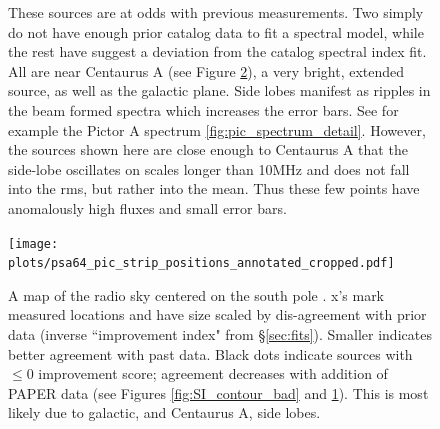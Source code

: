\documentclass[preprint]{aastex}
\begin{document}
\begin{figure}[htbp]
\begin{center}
\end{center}
\caption{
These sources are at odds with previous measurements.
Two simply do not have enough
prior catalog data to fit a spectral model, while the rest have
suggest a deviation from the catalog spectral index fit.
All are near Centaurus A (see Figure
\ref{fig:error_map}), a very bright, extended source, as well as the galactic plane.
Side lobes manifest as
ripples in the beam formed spectra which increases the error bars. See for example the 
Pictor A spectrum \ref{fig:pic_spectrum_detail}. However, the sources shown here are close
enough to Centaurus A that the side-lobe oscillates on scales longer than 10MHz
and does not fall into the rms, but rather into the mean. Thus these few points
have anomalously high fluxes and small error bars. 
} \label{fig:SI_contour_new}
\end{figure}





\begin{figure}
\texttt{[image: plots/psa64\_pic\_strip\_positions\_annotated\_cropped.pdf]}
\caption{
A map of the radio sky centered on the south pole
\citep{deOliveiraCosta:2008p2242}.  x's mark measured locations and have size
scaled by dis-agreement with prior data (inverse ``improvement index" from 
\S\ref{sec:fits}). Smaller indicates better agreement with past data.  Black dots indicate sources with $\le0$ improvement score;
agreement decreases with addition of PAPER data (see Figures \ref{fig:SI_contour_bad} and \ref{fig:SI_contour_new}). 
This is most likely due to galactic, and Centaurus A, side lobes.    \label{fig:error_map}
}
\end{figure}


\end{document}
